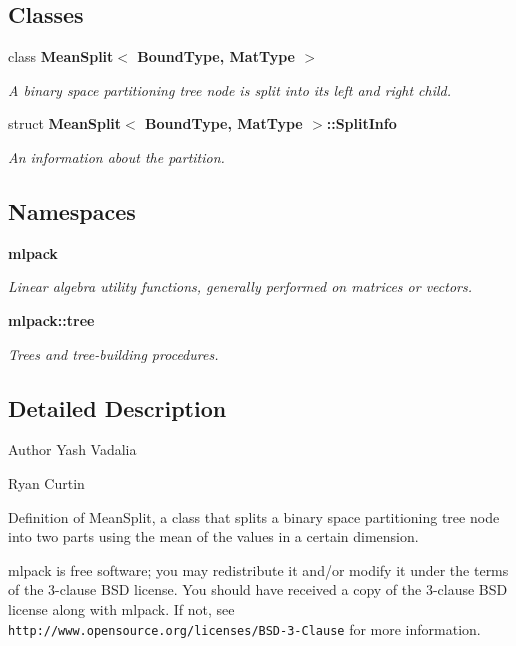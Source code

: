 \subsection*{Classes}
\begin{DoxyCompactItemize}
\item 
class \textbf{ Mean\+Split$<$ Bound\+Type, Mat\+Type $>$}
\begin{DoxyCompactList}\small\item\em A binary space partitioning tree node is split into its left and right child. \end{DoxyCompactList}\item 
struct \textbf{ Mean\+Split$<$ Bound\+Type, Mat\+Type $>$\+::\+Split\+Info}
\begin{DoxyCompactList}\small\item\em An information about the partition. \end{DoxyCompactList}\end{DoxyCompactItemize}
\subsection*{Namespaces}
\begin{DoxyCompactItemize}
\item 
 \textbf{ mlpack}
\begin{DoxyCompactList}\small\item\em Linear algebra utility functions, generally performed on matrices or vectors. \end{DoxyCompactList}\item 
 \textbf{ mlpack\+::tree}
\begin{DoxyCompactList}\small\item\em Trees and tree-\/building procedures. \end{DoxyCompactList}\end{DoxyCompactItemize}


\subsection{Detailed Description}
\begin{DoxyAuthor}{Author}
Yash Vadalia 

Ryan Curtin
\end{DoxyAuthor}
Definition of Mean\+Split, a class that splits a binary space partitioning tree node into two parts using the mean of the values in a certain dimension.

mlpack is free software; you may redistribute it and/or modify it under the terms of the 3-\/clause B\+SD license. You should have received a copy of the 3-\/clause B\+SD license along with mlpack. If not, see {\tt http\+://www.\+opensource.\+org/licenses/\+B\+S\+D-\/3-\/\+Clause} for more information. 